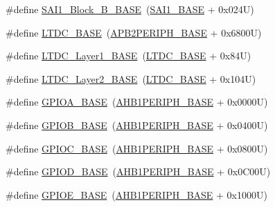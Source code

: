 \begin{DoxyCompactItemize}
\item 
\#define \hyperlink{group___peripheral__memory__map_gacdb59b321830def8c7a57c154178bc48}{S\+A\+I1\+\_\+\+Block\+\_\+\+B\+\_\+\+B\+A\+SE}~(\hyperlink{group___peripheral__memory__map_ga24c1053b754946b512f9c31123e09d21}{S\+A\+I1\+\_\+\+B\+A\+SE} + 0x024\+U)
\item 
\#define \hyperlink{group___peripheral__memory__map_gac6e45c39fafa3e82cdedbf447b461704}{L\+T\+D\+C\+\_\+\+B\+A\+SE}~(\hyperlink{group___peripheral__memory__map_ga25b99d6065f1c8f751e78f43ade652cb}{A\+P\+B2\+P\+E\+R\+I\+P\+H\+\_\+\+B\+A\+SE} + 0x6800\+U)
\item 
\#define \hyperlink{group___peripheral__memory__map_ga81a2641d0a8e698f32b160b2d20d070b}{L\+T\+D\+C\+\_\+\+Layer1\+\_\+\+B\+A\+SE}~(\hyperlink{group___peripheral__memory__map_gac6e45c39fafa3e82cdedbf447b461704}{L\+T\+D\+C\+\_\+\+B\+A\+SE} + 0x84\+U)
\item 
\#define \hyperlink{group___peripheral__memory__map_ga696614b764a3820d9f9560a0eec1e111}{L\+T\+D\+C\+\_\+\+Layer2\+\_\+\+B\+A\+SE}~(\hyperlink{group___peripheral__memory__map_gac6e45c39fafa3e82cdedbf447b461704}{L\+T\+D\+C\+\_\+\+B\+A\+SE} + 0x104\+U)
\item 
\#define \hyperlink{group___peripheral__memory__map_gad7723846cc5db8e43a44d78cf21f6efa}{G\+P\+I\+O\+A\+\_\+\+B\+A\+SE}~(\hyperlink{group___peripheral__memory__map_ga811a9a4ca17f0a50354a9169541d56c4}{A\+H\+B1\+P\+E\+R\+I\+P\+H\+\_\+\+B\+A\+SE} + 0x0000\+U)
\item 
\#define \hyperlink{group___peripheral__memory__map_gac944a89eb789000ece920c0f89cb6a68}{G\+P\+I\+O\+B\+\_\+\+B\+A\+SE}~(\hyperlink{group___peripheral__memory__map_ga811a9a4ca17f0a50354a9169541d56c4}{A\+H\+B1\+P\+E\+R\+I\+P\+H\+\_\+\+B\+A\+SE} + 0x0400\+U)
\item 
\#define \hyperlink{group___peripheral__memory__map_ga26f267dc35338eef219544c51f1e6b3f}{G\+P\+I\+O\+C\+\_\+\+B\+A\+SE}~(\hyperlink{group___peripheral__memory__map_ga811a9a4ca17f0a50354a9169541d56c4}{A\+H\+B1\+P\+E\+R\+I\+P\+H\+\_\+\+B\+A\+SE} + 0x0800\+U)
\item 
\#define \hyperlink{group___peripheral__memory__map_ga1a93ab27129f04064089616910c296ec}{G\+P\+I\+O\+D\+\_\+\+B\+A\+SE}~(\hyperlink{group___peripheral__memory__map_ga811a9a4ca17f0a50354a9169541d56c4}{A\+H\+B1\+P\+E\+R\+I\+P\+H\+\_\+\+B\+A\+SE} + 0x0\+C00\+U)
\item 
\#define \hyperlink{group___peripheral__memory__map_gab487b1983d936c4fee3e9e88b95aad9d}{G\+P\+I\+O\+E\+\_\+\+B\+A\+SE}~(\hyperlink{group___peripheral__memory__map_ga811a9a4ca17f0a50354a9169541d56c4}{A\+H\+B1\+P\+E\+R\+I\+P\+H\+\_\+\+B\+A\+SE} + 0x1000\+U)

\end{DoxyCompactItemize}
